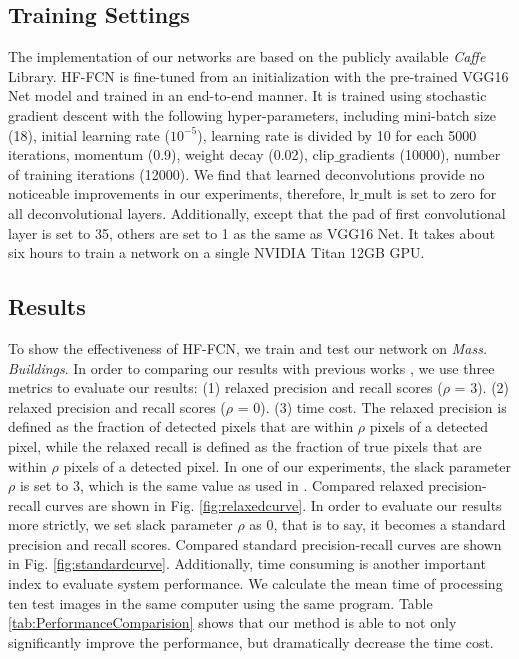 \documentclass[runningheads]{llncs}
\begin{document}
\subsection{Training Settings}
   The implementation of our networks are based on the publicly  available \textit{Caffe} \cite{Jia2014Caffe} Library. HF-FCN is fine-tuned from an initialization with the pre-trained VGG16 Net model and trained in an end-to-end manner. It is trained using stochastic gradient descent with the following hyper-parameters, including mini-batch size (18), initial learning rate ($10^{-5}$), learning rate is divided by 10 for each 5000 iterations, momentum (0.9), weight decay (0.02), clip$\_$gradients (10000), number of training iterations (12000). We find that learned deconvolutions provide no noticeable improvements in our experiments, therefore,  lr$\_$mult is set to zero for all deconvolutional layers. Additionally, except that the pad of first convolutional layer is set to 35, others are set to 1 as the  same as VGG16 Net. It takes about six hours to train a network on a single NVIDIA Titan 12GB GPU.

\subsection{Results}
    To show the effectiveness of HF-FCN, we train and test our network on \textit{Mass. Buildings}. In order to comparing our results with previous works \cite{Mnih2013Machine,Saito2016Multiple}, we use three metrics to evaluate our results: (1) relaxed precision and recall scores ($\rho$ = 3). (2) relaxed precision and recall scores ($\rho$ = 0). (3) time cost.  The relaxed precision is defined as the fraction of detected pixels that are within $\rho$ pixels of a detected pixel, while the relaxed recall is defined as the fraction of true pixels that are within $\rho$ pixels of a detected pixel.  In  one of our experiments, the slack parameter $\rho$ is set to 3, which is the same value as used in \cite{Mnih2013Machine,Saito2016Multiple}. Compared relaxed precision-recall curves are shown in  Fig. \ref{fig:relaxedcurve}. In order to evaluate our results more strictly, we set slack parameter $\rho$ as 0, that is to say, it becomes a standard precision and recall scores. Compared standard precision-recall curves are shown in  Fig. \ref{fig:standardcurve}. Additionally, time consuming is another important index to evaluate system performance. We calculate the mean time of processing ten test images in the same computer using the same program. Table \ref{tab:PerformanceComparision} shows that our method is able to not only significantly improve the performance, but dramatically decrease the time cost. 
      
\end{document}
